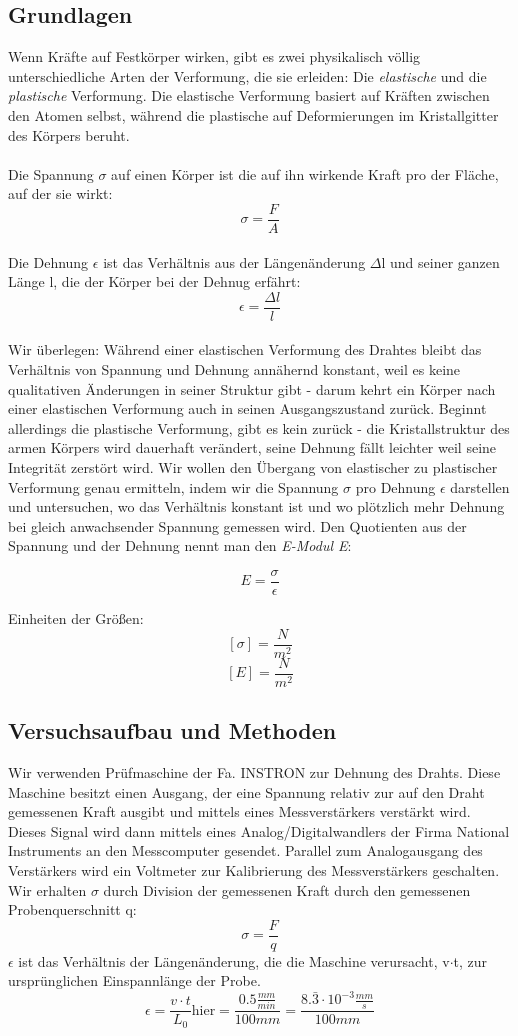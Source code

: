 \documentclass{article}
\begin{document}
\subsection{Grundlagen}
Wenn Kräfte auf Festkörper wirken, gibt es zwei physikalisch völlig unterschiedliche Arten der Verformung, die sie erleiden: Die \textit{elastische} und die \textit{plastische} Verformung. Die elastische Verformung basiert auf Kräften zwischen den Atomen selbst, während die plastische auf Deformierungen im Kristallgitter des Körpers beruht. \\
\\Die Spannung $\sigma$ auf einen Körper ist die auf ihn wirkende Kraft pro der Fläche, auf der sie wirkt:  $$ \sigma = \frac{F}{A} $$ \\
Die Dehnung  $\epsilon$ ist das Verhältnis aus der Längenänderung $\Delta$l und seiner ganzen Länge l, die der Körper bei der Dehnug erfährt: \\
$$ \epsilon= \frac{\Delta l}{l} $$ \\
 Wir überlegen: Während einer elastischen Verformung des Drahtes bleibt das Verhältnis von Spannung und Dehnung annähernd konstant, weil es keine qualitativen Änderungen in seiner Struktur gibt - darum kehrt ein Körper nach einer elastischen Verformung auch in seinen Ausgangszustand zurück. Beginnt allerdings die plastische Verformung, gibt es kein zurück - die Kristallstruktur des armen Körpers wird dauerhaft verändert, seine Dehnung fällt leichter weil seine Integrität zerstört wird. Wir wollen den Übergang von elastischer zu plastischer Verformung genau ermitteln, indem wir die Spannung $\sigma$ pro Dehnung $\epsilon$ darstellen und untersuchen, wo das Verhältnis konstant ist und wo plötzlich mehr Dehnung bei gleich anwachsender Spannung gemessen wird. Den Quotienten aus der Spannung und der Dehnung nennt man den \textit{E-Modul E}:

$$ E=\frac{\sigma}{\epsilon}$$

Einheiten der Größen:
$$[\sigma]=\frac{N}{m^2}$$
$$[E]=\frac{N}{m^2}$$
\subsection{Versuchsaufbau und Methoden}
Wir verwenden Prüfmaschine der Fa. INSTRON zur Dehnung des Drahts. Diese Maschine besitzt einen Ausgang, der eine Spannung relativ zur auf den Draht gemessenen Kraft ausgibt und mittels eines Messverstärkers verstärkt wird. Dieses Signal wird dann mittels eines Analog/Digitalwandlers der Firma National Instruments an den Messcomputer gesendet. Parallel zum Analogausgang des Verstärkers wird ein Voltmeter zur Kalibrierung des Messverstärkers geschalten.
Wir erhalten $\sigma$ durch Division der gemessenen Kraft durch den gemessenen Probenquerschnitt q:
$$ \sigma = \frac{F}{q}$$
$\epsilon$ ist das Verhältnis der Längenänderung, die die Maschine verursacht, v$\cdot$t, zur ursprünglichen Einspannlänge der Probe.
$$ \epsilon = \frac{v\cdot t}{L_0} \text{hier} = \frac{0.5\frac{mm}{min}}{100mm} = \frac{8.\bar{3}\cdot10^{-3}\frac{mm}{s}}{100mm}$$
\end{document}
